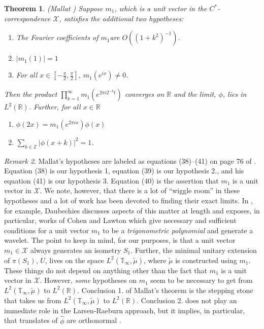 \documentclass{amsproc}
\theoremstyle{plain}
\newtheorem{thm}{Theorem}[section]
\theoremstyle{definition}
\theoremstyle{definition}
\theoremstyle{remark}
\newtheorem{rem}[thm]{Remark}
\theoremstyle{plain}
\begin{document}
\begin{thm}
\label{thm:Mallat}(Mallat \cite[Theorem
2]{sM89}) Suppose $m_{1}$, which is a unit vector
in the $C^{*}$-correspondence $\mathcal{X}$, satisfies the additional
two hypotheses:
\begin{enumerate}
\item The Fourier coefficients of $m_{1}$are $O((1+k^{2})^{-1}).$
\item $\vert m_{1}(1)\vert=1$
\item For all $x\in[-\frac{\pi}{2},\frac{\pi}{2}]$, $m_{1}(e^{ix})\neq0$.
\end{enumerate}
Then the product $\prod_{k=1}^{\infty}m_{1}(e^{2\pi i2^{-k}t})$ converges
on $\mathbb{R}$ and the limit, $\phi$, lies in $L^{2}(\mathbb{R})$.
Further, for all $x\in\mathbb{R}$

\begin{enumerate}
\item $\phi(2x)=m_{1}(e^{2\pi ix})\phi(x)$ 
\item $\sum_{k\in\mathbb{Z}}\vert\phi(x+k)\vert^{2}=1$. 
\end{enumerate}
\end{thm}

\begin{rem}
Mallat's hypotheses are labeled as equations (38)--(41) on page 76
of \cite{sM89}. Equation (38) is our hypothesis 1, equation (39)
is our hypothesis 2., and his equation (41) is our hypothesis 3. Equation
(40) is the assertion that $m_{1}$ is a unit vector in $\mathcal{X}$.
We note, however, that there is a lot of {}``wiggle room'' in these
hypotheses and a lot of work has been devoted to finding their exact
limits. In \cite[Chapter 6]{iD92}, for example, Daubechies discusses
aspects of this matter at length and exposes, in particular, works
of Cohen and Lawton which give necessary and sufficient conditions
for a unit vector $m_{1}$ to be a \emph{trigonometric polynomial}
and generate a wavelet. The point to keep in mind, for our purposes,
is that a unit vector $m_{1}\in\mathcal{X}$ always generates an isometry $S_1$.
Further, the minimal unitary extension of $\pi (S_1)$, $U$, lives on the space
$L^{2}(\mathbb{T}_{\infty},\tilde{\mu})$, where $\tilde{\mu}$ is constructed
using $m_1$. These things do not depend on anything other than the fact that
$m_1$ is a unit vector in $\mathcal{X}$.
However, \emph{some} hypotheses on $m_{1}$ seem to be necessary to get
from $L^{2}(\mathbb{T}_{\infty},\tilde{\mu})$ to $L^{2}(\mathbb{R})$.
Conclusion 1. of Mallat's theorem is the stepping stone that takes us
from $L^{2}(\mathbb{T}_{\infty},\tilde{\mu})$ to $L^{2}(\mathbb{R})$.
Conclusion 2. does not play an immediate role in the Larsen-Raeburn
approach, but it implies, in particular, that translates of $\hat{\phi}$
are orthonormal \cite[Equation (50)]{sM89}. 
\end{rem}
\end{document}
